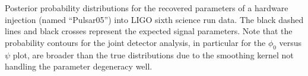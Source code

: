 \label{fig:hwinj05}
Posterior probability distributions for the recovered parameters of a hardware injection (named ``Pulsar05'')
into LIGO sixth science run data. The black dashed lines and black crosses represent the expected signal
parameters. Note that the probability contours for the joint detector analysis, in particular for the $\phi_0$
versus $\psi$ plot, are broader than the true distributions due to the smoothing kernel not handling the
parameter degeneracy well.
